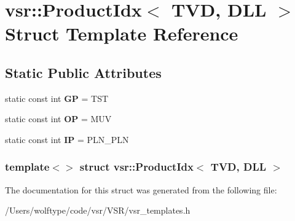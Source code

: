 \hypertarget{structvsr_1_1_product_idx_3_01_t_v_d_00_01_d_l_l_01_4}{\section{vsr\-:\-:Product\-Idx$<$ T\-V\-D, D\-L\-L $>$ Struct Template Reference}
\label{structvsr_1_1_product_idx_3_01_t_v_d_00_01_d_l_l_01_4}
}
\subsection*{Static Public Attributes}
\begin{DoxyCompactItemize}
\item 
\hypertarget{structvsr_1_1_product_idx_3_01_t_v_d_00_01_d_l_l_01_4_acb94afc2bb6a113830a8b77eef8c2f45}{static const int {\bfseries G\-P} = T\-S\-T}\label{structvsr_1_1_product_idx_3_01_t_v_d_00_01_d_l_l_01_4_acb94afc2bb6a113830a8b77eef8c2f45}

\item 
\hypertarget{structvsr_1_1_product_idx_3_01_t_v_d_00_01_d_l_l_01_4_a8fba3c755fb1344b54913021d817a2e1}{static const int {\bfseries O\-P} = M\-U\-V}\label{structvsr_1_1_product_idx_3_01_t_v_d_00_01_d_l_l_01_4_a8fba3c755fb1344b54913021d817a2e1}

\item 
\hypertarget{structvsr_1_1_product_idx_3_01_t_v_d_00_01_d_l_l_01_4_a22b71fa64422715d51d2c712a22af674}{static const int {\bfseries I\-P} = P\-L\-N\-\_\-\-P\-L\-N}\label{structvsr_1_1_product_idx_3_01_t_v_d_00_01_d_l_l_01_4_a22b71fa64422715d51d2c712a22af674}

\end{DoxyCompactItemize}
\subsubsection*{template$<$$>$ struct vsr\-::\-Product\-Idx$<$ T\-V\-D, D\-L\-L $>$}



The documentation for this struct was generated from the following file\-:\begin{DoxyCompactItemize}
\item 
/\-Users/wolftype/code/vsr/\-V\-S\-R/vsr\-\_\-templates.\-h\end{DoxyCompactItemize}
